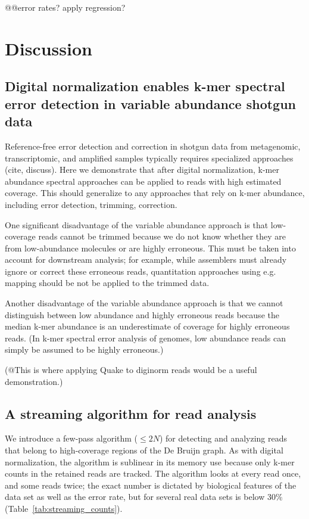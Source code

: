 \documentclass{article}
\begin{document}
@@error rates? apply regression?

\section{Discussion}

\subsection{Digital normalization enables k-mer spectral error detection in variable abundance shotgun data}

Reference-free error detection and correction in shotgun data from
metagenomic, transcriptomic, and amplified samples typically requires
specialized approaches (cite, discuss).  Here we demonstrate that
after digital normalization, k-mer abundance spectral approaches can
be applied to reads with high estimated coverage.  This should
generalize to any approaches that rely on k-mer abundance, including
error detection, trimming, correction.

One significant disadvantage of the variable abundance approach is
that low-coverage reads cannot be trimmed because we do not know
whether they are from low-abundance molecules or are highly erroneous.
This must be taken into account for downstream analysis; for example,
while assemblers must already ignore or correct these erroneous reads,
quantitation approaches using e.g. mapping should be not be applied
to the trimmed data.

Another disadvantage of the variable abundance approach is that we cannot
distinguish between low abundance and highly erroneous reads because the
median k-mer abundance is an underestimate of coverage for highly erroneous
reads.  (In k-mer spectral error analysis of genomes, low abundance reads
can simply be assumed to be highly erroneous.)

(@This is where applying Quake to diginorm reads would be a useful demonstration.)

\subsection{A streaming algorithm for read analysis}

We introduce a few-pass algorithm ($\leq 2N$) for detecting and
analyzing reads that belong to high-coverage regions of the De Bruijn
graph.  As with digital normalization, the algorithm is sublinear in
its memory use because only k-mer counts in the retained reads are
tracked.  The algorithm looks at every read once, and some reads
twice; the exact number is dictated by biological features of the
data set as well as the error rate, but for several real data sets is below
30\% (Table~\ref{tab:streaming_counts}).
\end{document}
